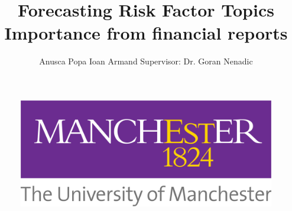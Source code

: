 \documentclass[12pt,MSc,a4paper,oneside]{muthesis}
\newcommand{\detailtexcount}[1]{%
  \immediate\write18{texcount -merge -sum #1.tex > #1.wcdetail }%
}
\newcommand{\quickwordcount}[1]{%
  \immediate\write18{texcount -1 -sum -merge #1.tex > #1-words.sum }%
   words%
}
\newcommand{\quickcharcount}[1]{%
  \immediate\write18{texcount -1 -sum -merge -char #1.tex > #1-chars.sum }%
   characters (not including spaces)%
}
\begin{document}
\begin{figure}[t]
  \centering
  \includegraphics[scale=0.1]{images/uom.png}
\end{figure}

\title{Forecasting Risk Factor Topics
Importance from financial reports}
\author{
  Anusca Popa Ioan Armand
  \newline
  Supervisor: Dr. Goran Nenadic
}

\def\wordcount{\quickwordcount{main}}





\beforeabstract
\end{document}
